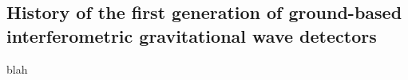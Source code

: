 \subsection{History of the first generation of ground-based interferometric gravitational wave detectors}\label{subsec:history}

blah